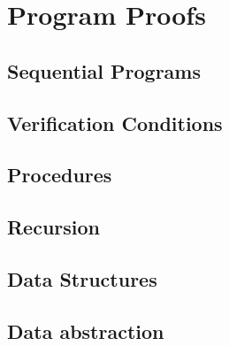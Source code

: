\documentclass[12pt, a4paper]{book}
\begin{document}
  \chapter{Program Proofs}
  \label{chap:Program Proofs}

  \section{Sequential Programs}
  \label{sec:Sequential Programs}

  \section{Verification Conditions}
  \label{sec:Verification Conditions}
  \section{Procedures}
  \label{sec:Procedures}

  \section{Recursion}
  \label{sec:Recursion}

  \section{Data Structures}
  \label{sec:Data Structures}

  \section{Data abstraction}
  \label{sec:Data abstraction}
\end{document}
